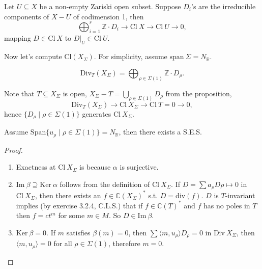 \documentclass[a4paper,12pt]{amsart}
\newcommand{\ZZ}{\mathbb{Z}}
\newcommand{\RR}{\mathbb{R}}
\newcommand{\CC}{\mathbb{C}}
\begin{document}
\begin{proposition}
	Let $U\subseteq X$ be a non-empty Zariski open subset. Suppose $D_i$'s are the irreducible components of $X-U$ of codimension 1, then
	\begin{displaymath}
	\bigoplus_{i=1}^r\ZZ\cdot D_i\to\mathrm{Cl}~X\to\mathrm{Cl}~U\to0,
	\end{displaymath}
	mapping $D\in\mathrm{Cl}~X$ to $D|_U\in\mathrm{Cl}~U$.
\end{proposition}

Now let's compute $\mathrm{Cl}(X_\Sigma)$. For simplicity, assume $\mathrm{span}~\Sigma=N_\RR$.

\begin{Def}
	\begin{displaymath}
	\mathrm{Div}_T(X_\Sigma)=\bigoplus_{\rho\in\Sigma(1)}\ZZ\cdot D_\rho.
	\end{displaymath}
\end{Def}

Note that $T\subseteq X_\Sigma$ is open, $X_\Sigma-T=\bigcup_{\rho\in\Sigma(1)}D_\rho$ from the proposition,
\begin{displaymath}
\mathrm{Div}_T(X_\Sigma)\to\mathrm{Cl}~X_\Sigma\to\mathrm{Cl}~T=0\to0,
\end{displaymath}
hence $\{D_\rho\mid\rho\in\Sigma(1)\}$ generates $\mathrm{Cl}~X_\Sigma$.

\begin{theorem}
	Assume $\mathrm{Span}\{u_\rho\mid\rho\in\Sigma(1)\}=N_\RR$, then there exists a S.E.S.
	\begin{center}
	\end{center}
\end{theorem}
\begin{proof}
	\begin{enumerate}
		\item Exactness at $\mathrm{Cl}~X_\Sigma$ is because $\alpha$ is surjective.
		\item $\mathrm{Im}~\beta\supseteq\mathrm{Ker}~\alpha$ follows from the definition of $\mathrm{Cl}~X_\Sigma$. If $D=\sum a_\rho D\rho\mapsto0$ in $\mathrm{Cl}~X_\Sigma$, then there exists an $f\in\CC(X_\Sigma)^*$ s.t. $D=\mathrm{div}(f)$. $D$ is $T$-invariant implies (by exercise 3.2.4, C.L.S.) that if $f\in\CC(T)^*$ and $f$ has no poles in $T$ then $f=ct^m$ for some $m\in M$. So $D\in\mathrm{Im}~\beta$.
		\item $\mathrm{Ker}~\beta=0$. If $m$ satisfies $\beta(m)=0$, then $\sum\langle m,u_\rho\rangle D_\rho=0$ in $\mathrm{Div}~X_\Sigma$, then $\langle m,u_\rho\rangle=0$ for all $\rho\in\Sigma(1)$, therefore $m=0$.
	\end{enumerate}
\end{proof}
\end{document}
